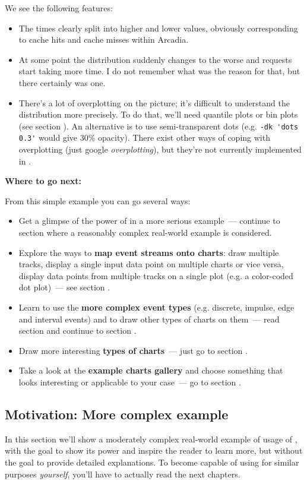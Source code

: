 \documentclass{article}
\begin{document}
We see the following features:
\begin{itemize}
\item The times clearly split into higher and lower values, obviously corresponding to cache hits and cache misses within Arcadia.
\item At some point the distribution suddenly changes to the worse and requests start taking more time. I do not remember what was the reason for that, but there certainly was one.
\item There's a lot of overplotting on the picture; it's difficult to understand the distribution more precisely. To do that, we'll need quantile plots or bin plots (see section ). An alternative is to use semi-transparent dots (e.g. \verb|-dk 'dots 0.3'| would give 30\% opacity). There exist other ways of coping with overplotting (just google \emph{overplotting}), but they're not currently implemented in \timeplot{}.
\end{itemize}

\textbf{Where to go next:}

From this simple example you can go several ways:
\begin{itemize}
\item Get a glimpse of the power of \timeplot{} in a more serious example~--- continue to section  where a reasonably complex real-world example is considered.
\item Explore the ways to \textbf{map event streams onto charts}: draw multiple tracks, display a single input data point on multiple charts or vice versa, display data points from multiple tracks on a single plot (e.g. a color-coded dot plot)~--- see section .
\item Learn to use the \textbf{more complex event types} (e.g. discrete, impulse, edge and interval events) and to draw other types of charts on them~--- read section  and continue to section .
\item Draw more interesting \textbf{types of charts}~--- just go to section .
\item Take a look at the \textbf{example charts gallery} and choose something that looks interesting or applicable to your case~--- go to section .
\end{itemize}

\subsection{Motivation: More complex example}
\label{sec:tplot-motivation}
In this section we'll show a moderately complex real-world example of usage of \timeplot{}, with the goal to show its power and inspire the reader to learn more, but without the goal to provide detailed explanations. To become capable of using \timeplot{} for similar purposes \emph{yourself}, you'll have to actually read the next chapters.
\end{document}
